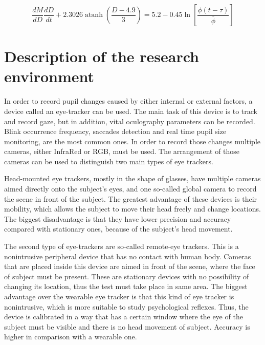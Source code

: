 \documentclass[USenglish,twocolumn]{article}
\begin{document}
\begin{equation}
\label{equ:Pampelona}
\frac { d M } { d D } \frac { d D } { d t } + 2.3026 \operatorname { atanh } \left( \frac { D - 4.9 } { 3 } \right) = 5.2 - 0.45 \ln \left[ \frac { \phi ( t - \tau ) } { \overline { \phi } } \right]
\end{equation}

\section{Description of the research environment}
In order to record pupil changes caused by either internal or external factors, a device called an eye-tracker can be used. The main task of this device is to track and record gaze, but in addition, vital oculography parameters can be recorded. Blink occurrence frequency, saccades detection and real time pupil size monitoring, are the most common ones. In order to record those changes multiple cameras, either InfraRed or RGB, must be used. The arrangement of those cameras can be used to distinguish two main types of eye trackers. 

Head-mounted eye trackers, mostly in the shape of glasses, have multiple cameras aimed directly onto the subject’s eyes, and one so-called global camera to record the scene in front of the subject.  The greatest advantage of these devices is their mobility, which allows the subject to move their head freely and change locations. The biggest disadvantage is that they have lower precision and accuracy compared with stationary ones, because of the subject’s head movement.

The second type of eye-trackers are so-called remote-eye trackers. This is a nonintrusive peripheral device that has no contact with human body. Cameras that are placed inside this device are aimed in front of the scene, where the face of subject must be present. These are stationary devices with no possibility of changing its location, thus the test must take place in same area. The biggest advantage over the wearable eye tracker is that this kind of eye tracker is nonintrusive, which is more suitable to study psychological reflexes. Thus, the device is calibrated in a way that has a certain window where the eye of the subject must be visible and there is no head movement of subject. Accuracy is higher in comparison with a wearable one.
\end{document}
